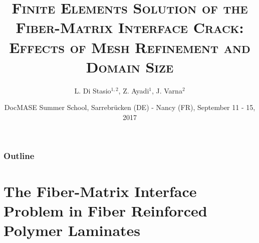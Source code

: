 \documentclass[first,firstsupp,lastsupp,handout,last,hyperref,table]{ETHclass}
\makeatletter
\newenvironment{withoutheadline}{
         \setbeamertemplate{headline}{%
\vspace{35pt}
}
    }{}
\makeatother
\begin{document}

\title[\textsc{FEM \& the Fiber-Matrix Interface Crack}]{\textsc{Finite Elements Solution of the Fiber-Matrix Interface Crack: Effects of Mesh Refinement and Domain Size}}
\author{ L. Di Stasio$^{1,2}$, Z. Ayadi$^{1}$, J. Varna$^{2}$}
\date{DocMASE Summer School, Sarrebr\"ucken (DE) - Nancy (FR), September 11 - 15, 2017}

\begin{frame}[plain]
    \titlepage
\end{frame}

\begin{withoutheadline}
\begin{frame}
\frametitle{Outline}
\justifying
\vspace*{-0.5cm}
\tableofcontents[hidesubsections]
\end{frame}
\end{withoutheadline}



\section[The Fiber-Matrix Interface Problem in FRPC]{The Fiber-Matrix Interface Problem in Fiber Reinforced Polymer Laminates}
\end{document}
